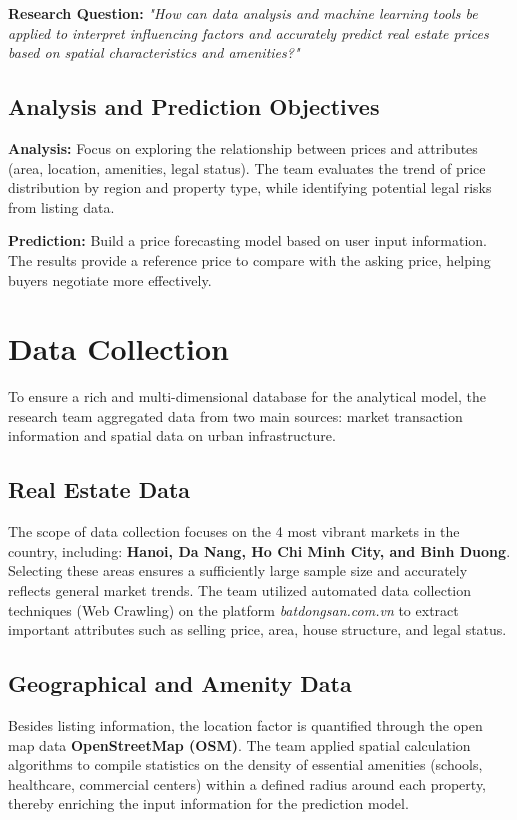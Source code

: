 \documentclass[12pt, a4paper]{article}
\begin{document}
\textbf{Research Question:} \textit{"How can data analysis and machine learning tools be applied to interpret influencing factors and accurately predict real estate prices based on spatial characteristics and amenities?"}

\subsection{Analysis and Prediction Objectives}
\textbf{Analysis:} Focus on exploring the relationship between prices and attributes (area, location, amenities, legal status). The team evaluates the trend of price distribution by region and property type, while identifying potential legal risks from listing data.

\textbf{Prediction:} Build a price forecasting model based on user input information. The results provide a reference price to compare with the asking price, helping buyers negotiate more effectively.

\section{Data Collection}
To ensure a rich and multi-dimensional database for the analytical model, the research team aggregated data from two main sources: market transaction information and spatial data on urban infrastructure.

\subsection{Real Estate Data}
The scope of data collection focuses on the 4 most vibrant markets in the country, including: \textbf{Hanoi, Da Nang, Ho Chi Minh City, and Binh Duong}. Selecting these areas ensures a sufficiently large sample size and accurately reflects general market trends. The team utilized automated data collection techniques (Web Crawling) on the platform \textit{batdongsan.com.vn} to extract important attributes such as selling price, area, house structure, and legal status.

\subsection{Geographical and Amenity Data}
Besides listing information, the location factor is quantified through the open map data \textbf{OpenStreetMap (OSM)}. The team applied spatial calculation algorithms to compile statistics on the density of essential amenities (schools, healthcare, commercial centers) within a defined radius around each property, thereby enriching the input information for the prediction model.
\end{document}
